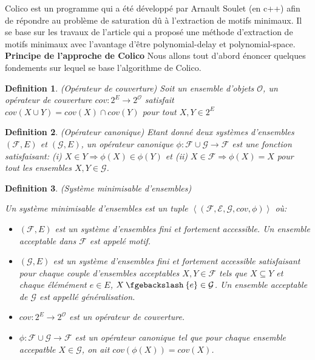 \documentclass[a4paper,12pt,openany,oneside]{article}
\newcommand{\mysetminus}{\mathbin{\fgebackslash}}
\newtheorem{defn}{Definition} %
\begin{document}
Colico est un programme qui a été développé par Arnault Soulet (en c++) afin de répondre au problème de saturation dû à l'extraction de motifs minimaux. Il se base sur les travaux de l'article \cite{..} qui a proposé une méthode d'extraction de motifs minimaux avec l'avantage d'être polynomial-delay et polynomial-space. \\

\textbf{Principe de l'approche de Colico}
Nous allons tout d'abord énoncer quelques fondements sur lequel se base l'algorithme de Colico.

\begin{defn}(Opérateur de couverture)
 Soit un ensemble d'objets $\mathcal{O}$, un opérateur de couverture $cov: 2^E\rightarrow 2^\mathcal{O}$ satisfait $cov(X\cup Y)=cov(X)\cap cov(Y)$ pour tout $X,Y\in 2^E$ 
\end{defn}

\begin{defn}(Opérateur canonique)
	Etant donné deux systèmes d'ensembles $(\mathcal{F},E)$ et $(\mathcal{G},E)$, un opérateur canonique $\phi: \mathcal{F}\cup \mathcal{G}\rightarrow \mathcal{F}$ est une fonction satisfaisant: (i) $X\in Y\Rightarrow \phi(X)\in \phi(Y)$ et (ii) $X\in \mathcal{F}\Rightarrow\phi(X)=X$ pour tout les ensembles $X,Y\in \mathcal{G}$.
\end{defn}

\begin{defn}(Système minimisable d'ensembles)

Un système minimisable d'ensembles est un tuple $\left< (\mathcal{F},\mathcal{E},\mathcal{G}, cov,\phi)\right>$ où:
\begin{itemize}
	\item $(\mathcal{F},E)$ est un système d'ensembles fini et fortement accessible. Un ensemble acceptable dans $\mathcal{F}$ est appelé motif.
	\item  $(\mathcal{G},E)$ est un système d'ensembles fini et fortement accessible satisfaisant pour chaque couple d'ensembles acceptables $X,Y\in \mathcal{F}$ tels que $X\subseteq Y$ et chaque élémément $e\in E$, $X\mysetminus\{e\}\in \mathcal{G}$. Un ensemble acceptable de $\mathcal{G}$ est appellé \textit{généralisation}.
	\item $cov: 2^E\rightarrow 2^\mathcal{O}$ est un \textit{opérateur de couverture}.
	\item $\phi: \mathcal{F}\cup \mathcal{G}\rightarrow \mathcal{F}$ est un \textit{opérateur canonique} tel que pour chaque ensemble accepatble $X\in \mathcal{G}$, on ait $cov(\phi(X))=cov(X)$.
\end{itemize}

\end{defn}
\end{document}

